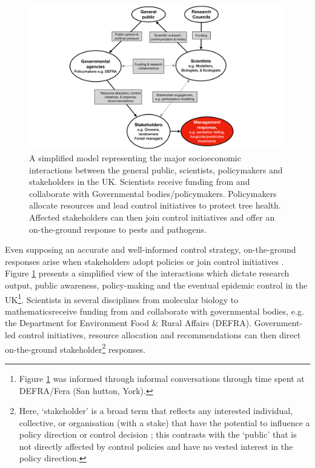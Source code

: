 \begin{figure}
    \centering
    \includegraphics[scale=0.35]{chapter1/figures/modelling-and-policy.pdf}
    \caption{A simplified model representing the major socioeconomic interactions between the general public, scientists, 
    policymakers and stakeholders in the UK. Scientists receive funding from and collaborate with Governmental bodies/policymakers. 
    Policymakers allocate resources and lead control initiatives to protect tree health. 
    Affected stakeholders can then join control initiatives and offer an on-the-ground response to pests and pathogens.}
    \label{fig:modelling-and-policies}
\end{figure}

\newpage

Even supposing an accurate and well-informed control strategy,
on-the-ground responses arise when stakeholders adopt policies or join control initiatives \cite{reed2018theory}.
Figure \ref{fig:modelling-and-policies} presents a simplified view of the interactions which dictate research output, public awareness, 
policy-making and the eventual epidemic control in the UK\footnote{
Figure \ref{fig:modelling-and-policies} was informed through informal conversations
through time spent at DEFRA/Fera (San hutton, York).}. Scientists in several disciplines\textemdash
from molecular biology to mathematics\textemdash receive funding from and collaborate with governmental
bodies, e.g. the Department for Environment Food \& Rural Affairs (DEFRA). Government-led control initiatives, resource
allocation and recommendations can then direct on-the-ground stakeholder\footnote{Here, `stakeholder' is a broad
term that reflects any interested individual, collective, or organisation 
(with a stake) that have the potential to influence a policy direction or control decision
\cite{brugha2000stakeholder}; this contrasts with the `public' that is not directly affected by control policies and have no vested interest in the policy direction.} 
responses. 

